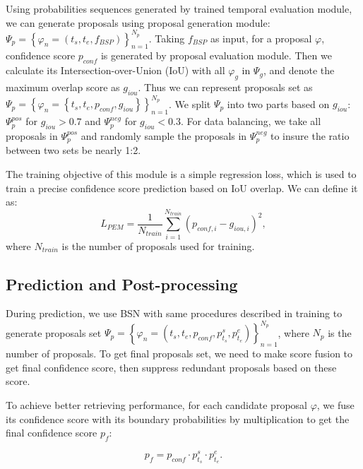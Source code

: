 \documentclass[runningheads]{llncs}
\begin{document}
Using probabilities sequences generated by trained temporal evaluation module, we can generate proposals using proposal generation module: $\Psi_p  = \left \{ \varphi _n=(t_s,t_e,f_{BSP}) \right \}_{n=1}^{N_p}$. Taking $f_{BSP}$ as input, for a proposal $\varphi$,  confidence score $p_{conf}$ is generated by proposal evaluation module. Then we calculate its Intersection-over-Union (IoU)  with all $\varphi_g$ in $\Psi_g$, and denote the maximum overlap score as $g_{iou}$. Thus we can represent proposals set as $\Psi_p  = \left \{ \varphi _n =\left \{t_s,t_e,p_{conf},g_{iou}   \right \} \right \}_{n=1}^{N_p}$.
We split $\Psi_p$ into two parts based on $g_{iou}$: $\Psi_p^{pos}$ for $g_{iou}>0.7$ and  $\Psi_p^{neg}$ for $g_{iou}<0.3$. For data balancing, we take all proposals in $\Psi_p^{pos}$ and randomly sample the proposals in $\Psi_p^{neg}$ to insure the ratio between two sets be nearly 1:2.

The training objective of this module is a simple regression loss, which is used to train a precise confidence score prediction based on IoU overlap. We can define it as:
\begin{equation}
L_{PEM}=\frac{1}{N_{train}} \sum_{i=1}^{N_{train}}(p_{conf,i}-g_{iou,i})^2 ,
\end{equation}
where $N_{train}$ is the number of proposals used for training.

\subsection{Prediction and Post-processing}


During prediction, we use BSN with same procedures described in training to generate proposals set $\Psi_p  = \left \{  \varphi  _n=(t_s, t_e, p_{conf}, p^s_{t_s} ,  p^e_{t_e}  ) \right \}_{n=1}^{N_p}$, where   $N_p$ is the number of proposals.
To get final proposals set, we need to make score fusion to get final confidence score, then suppress redundant proposals based on these score.

To achieve better retrieving performance, for each candidate proposal $\varphi$,  we fuse its confidence score with its boundary probabilities by multiplication to get the final confidence score $p_{f}$:

\begin{equation}
p_{f}=p_{conf} \cdot p^s_{t_s} \cdot p^e_{t_e} .
\end{equation}
\end{document}

